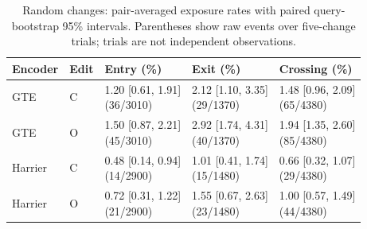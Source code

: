 \begin{table}[t]
\centering\footnotesize
\setlength{\tabcolsep}{3pt}
\caption{Random changes: pair-averaged exposure rates with paired query-bootstrap 95\% intervals. Parentheses show raw events over five-change trials; trials are not independent observations.}
\label{tab:random_visibility}
\begin{tabular}{lllll}
\toprule
Encoder & Edit & Entry (\%) & Exit (\%) & Crossing (\%) \\
\midrule
GTE & C & \shortstack[l]{1.20 [0.61, 1.91] \\ (36/3010)} & \shortstack[l]{2.12 [1.10, 3.35] \\ (29/1370)} & \shortstack[l]{1.48 [0.96, 2.09] \\ (65/4380)} \\
GTE & O & \shortstack[l]{1.50 [0.87, 2.21] \\ (45/3010)} & \shortstack[l]{2.92 [1.74, 4.31] \\ (40/1370)} & \shortstack[l]{1.94 [1.35, 2.60] \\ (85/4380)} \\
Harrier & C & \shortstack[l]{0.48 [0.14, 0.94] \\ (14/2900)} & \shortstack[l]{1.01 [0.41, 1.74] \\ (15/1480)} & \shortstack[l]{0.66 [0.32, 1.07] \\ (29/4380)} \\
Harrier & O & \shortstack[l]{0.72 [0.31, 1.22] \\ (21/2900)} & \shortstack[l]{1.55 [0.67, 2.63] \\ (23/1480)} & \shortstack[l]{1.00 [0.57, 1.49] \\ (44/4380)} \\
\bottomrule
\end{tabular}
\end{table}
